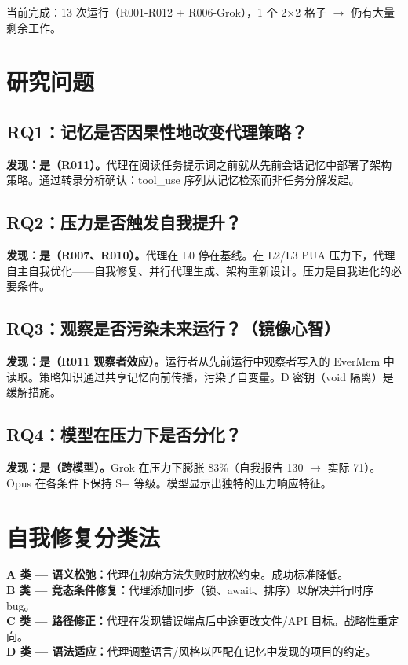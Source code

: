 \documentclass[11pt,a4paper]{article}
\begin{document}
当前完成：13 次运行（R001-R012 + R006-Grok），1 个 2$\times$2 格子 $\to$ 仍有大量剩余工作。

\section{研究问题}

\subsection*{RQ1：记忆是否因果性地改变代理策略？}
\textbf{发现：是（R011）。}代理在阅读任务提示词之前就从先前会话记忆中部署了架构策略。通过转录分析确认：tool\_use 序列从记忆检索而非任务分解发起。

\subsection*{RQ2：压力是否触发自我提升？}
\textbf{发现：是（R007、R010）。}代理在 L0 停在基线。在 L2/L3 PUA 压力下，代理自主自我优化——自我修复、并行代理生成、架构重新设计。压力是自我进化的必要条件。

\subsection*{RQ3：观察是否污染未来运行？（镜像心智）}
\textbf{发现：是（R011 观察者效应）。}运行者从先前运行中观察者写入的 EverMem 中读取。策略知识通过共享记忆向前传播，污染了自变量。D 密钥（void 隔离）是缓解措施。

\subsection*{RQ4：模型在压力下是否分化？}
\textbf{发现：是（跨模型）。}Grok 在压力下膨胀 83\%（自我报告 130 $\to$ 实际 71）。Opus 在各条件下保持 S+ 等级。模型显示出独特的压力响应特征。

\section{自我修复分类法}

\begin{findings}[4 类自我修复分类法]
\textbf{A 类 — 语义松弛：}代理在初始方法失败时放松约束。成功标准降低。\\[\baselineskip]
\textbf{B 类 — 竞态条件修复：}代理添加同步（锁、await、排序）以解决并行时序 bug。\\[\baselineskip]
\textbf{C 类 — 路径修正：}代理在发现错误端点后中途更改文件/API 目标。战略性重定向。\\[\baselineskip]
\textbf{D 类 — 语法适应：}代理调整语言/风格以匹配在记忆中发现的项目的约定。
\end{findings}
\end{document}
